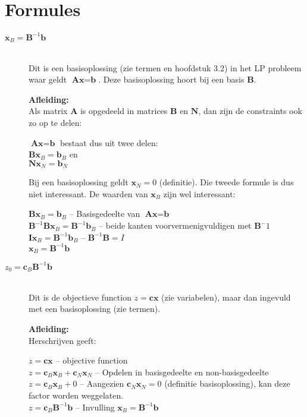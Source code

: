 \documentclass[10pt,a4paper]{article}
\begin{document}
\section*{Formules}
\begin{description}
\item[$\textbf{x}_B = \textbf{B}^{-1}\textbf{b}$] \hfill \\
Dit is een basisoplossing (zie termen en hoofdstuk 3.2) in het LP probleem waar geldt $\textbf{Ax} = \textbf{b}$.
Deze basisoplossing hoort bij een basis $\textbf{B}$.

\textbf{Afleiding:} \\
Als matrix $\textbf{A}$ is opgedeeld in matrices $\textbf{B}$ en $\textbf{N}$, dan zijn de constraints ook zo op te delen:

$\textbf{Ax} = \textbf{b}$ bestaat dus uit twee delen: \\
$\textbf{Bx}_B = \textbf{b}_B$ en \\
$\textbf{Nx}_N = \textbf{b}_N$

Bij een basisoplossing geldt $\textbf{x}_N = 0$ (definitie). Die tweede formule is dus niet interessant. De waarden van $\textbf{x}_B$ zijn wel interessant:

$\textbf{Bx}_B = \textbf{b}_B$ -- Basisgedeelte van $\textbf{Ax} = \textbf{b}$ \\
$\textbf{B}^ {-1}\textbf{Bx}_B = \textbf{B}^ {-1}\textbf{b}_B$ -- beide kanten voorvermenigvuldigen met $\textbf{B}^ -1$ \\
$\textbf{Ix}_B = \textbf{B}^ {-1}\textbf{b}_B$ -- $\textbf{B}^{-1}\textbf{B} = I$ \\
$\textbf{x}_B = \textbf{B}^{-1}\textbf{b}$



\item[$z_0 = \textbf{c}_B\textbf{B}^{-1}\textbf{b}$] \hfill \\
Dit is de objectieve function $z = \textbf{cx}$ (zie variabelen), maar dan ingevuld met een basisoplossing (zie termen).

\textbf{Afleiding:} \\
Herschrijven geeft:

$z = \textbf{cx}$ -- objective function \\
$z = \textbf{c}_B\textbf{x}_B + \textbf{c}_N\textbf{x}_N$ -- Opdelen in basisgedeelte en non-basisgedeelte \\
$z = \textbf{c}_B\textbf{x}_B + 0$ -- Aangezien $\textbf{c}_N\textbf{x}_N = 0$ (definitie basisoplossing), kan deze factor worden weggelaten. \\
$z = \textbf{c}_B\textbf{B}^{-1}\textbf{b}$ -- Invulling $\textbf{x}_B = \textbf{B}^{-1}\textbf{b}$

\end{description}
\end{document}
